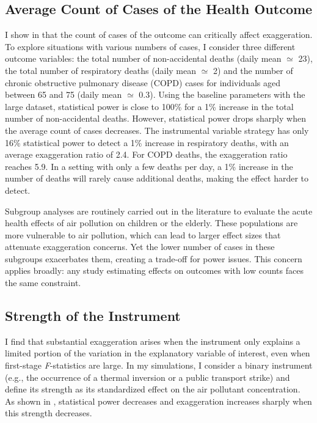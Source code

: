 \documentclass[12pt]{article}
\begin{document}
        \subsection{Average Count of Cases of the Health Outcome}
    
            
            
            I show in  that the count of cases of the outcome can critically affect exaggeration. To explore situations with various numbers of cases, I consider three different outcome variables: the total number of non-accidental deaths (daily mean $\simeq$ 23), the total number of respiratory deaths (daily mean  $\simeq$ 2) and the number of chronic obstructive pulmonary disease (COPD) cases for individuals aged between 65 and 75 (daily mean  $\simeq$  0.3). Using the baseline parameters with the large dataset, statistical power is close to 100\% for a 1\% increase in the total number of non-accidental deaths. However, statistical power drops sharply when the average count of cases decreases. The instrumental variable strategy has only 16\% statistical power to detect a 1\% increase in respiratory deaths, with an average exaggeration ratio of 2.4. For COPD deaths, the exaggeration ratio reaches 5.9. In a setting with only a few deaths per day, a 1\% increase in the number of deaths will rarely cause additional deaths, making the effect harder to detect.
            
            Subgroup analyses are routinely carried out in the literature to evaluate the acute health effects of air pollution on children or the elderly. These populations are more vulnerable to air pollution, which can lead to larger effect sizes that attenuate exaggeration concerns. Yet the lower number of cases in these subgroups exacerbates them, creating a trade-off for power issues. This concern applies broadly: any study estimating effects on outcomes with low counts faces the same constraint.

        \subsection{Strength of the Instrument}
        
        		I find that substantial exaggeration arises when the instrument only explains a limited portion of the variation in the explanatory variable of interest, even when first-stage \textit{F}-statistics are large. In my simulations, I consider a binary instrument (e.g., the occurrence of a thermal inversion or a public transport strike) and define its strength as its standardized effect on the air pollutant concentration. As shown in , statistical power decreases and exaggeration increases sharply when this strength decreases. 
            
\end{document}
